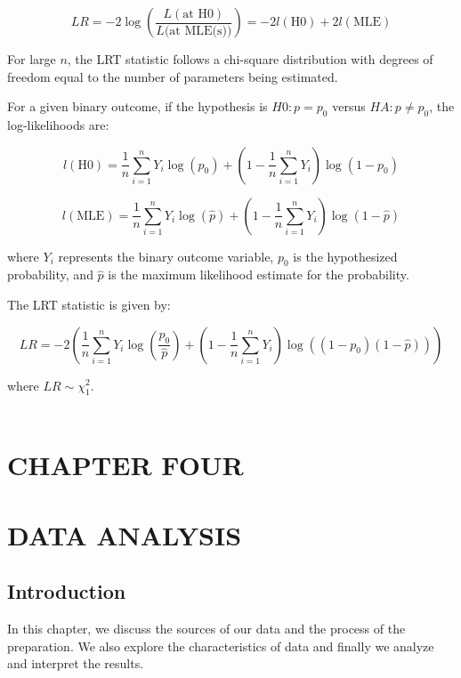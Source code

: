 \documentclass[12pt]{article}
\numberwithin{equation}{section}
\begin{document}
\begin{equation}
LR = -2 \log \left( \frac{{L(\text{{at H0}})}}{{L(\text{{at MLE(s)})}}} \right) = -2l(\text{{H0}}) + 2l(\text{{MLE}})
\label{eq:3.10}
	\end{equation}

For large \(n\), the LRT statistic follows a chi-square distribution with degrees of freedom equal to the number of parameters being estimated.

For a given binary outcome, if the hypothesis is \(H0 : p = p_0\) versus \(HA : p \neq p_0\), the log-likelihoods are:

\[
l(\text{{H0}}) = \frac{1}{n} \sum_{i=1}^{n} Y_i \log(p_0) + \left(1 - \frac{1}{n} \sum_{i=1}^{n} Y_i\right) \log(1 - p_0)
\]

\[
l(\text{{MLE}}) = \frac{1}{n} \sum_{i=1}^{n} Y_i \log(\hat{p}) + \left(1 - \frac{1}{n} \sum_{i=1}^{n} Y_i\right) \log(1 - \hat{p})
\]

where \(Y_i\) represents the binary outcome variable, \(p_0\) is the hypothesized probability, and \(\hat{p}\) is the maximum likelihood estimate for the probability.

The LRT statistic is given by:

\begin{equation}
LR = -2 \left( \frac{1}{n} \sum_{i=1}^{n} Y_i \log \left( \frac{p_0}{\hat{p}} \right) + \left(1 - \frac{1}{n} \sum_{i=1}^{n} Y_i\right) \log((1 - p_0)(1 - \hat{p})) \right)
\label{eq:3.10}
	\end{equation}

	
	where \(LR \sim \chi^2_1\).\\~\\

\newpage

\section*{CHAPTER FOUR}
\section*{DATA ANALYSIS}
\setcounter{section}{4}
\setcounter{subsection}{0}
\subsection{Introduction}
In this chapter, we discuss the sources of our data and the process of the preparation. We also explore the characteristics of data and finally we analyze and interpret the results.
\end{document}
